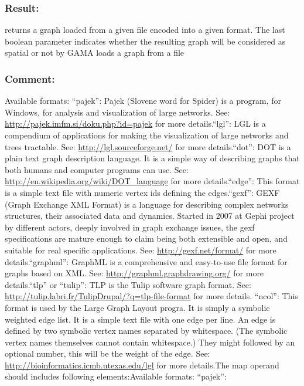 \documentclass[]{book}
\theoremstyle{definition}
\theoremstyle{definition}
\theoremstyle{definition}
\theoremstyle{remark}
\begin{document}
\subsubsection{Result:}\label{result-316}

returns a graph loaded from a given file encoded into a given format.
The last boolean parameter indicates whether the resulting graph will be
considered as spatial or not by GAMA loads a graph from a file

\subsubsection{Comment:}\label{comment-62}

Available formats: ``pajek'': Pajek (Slovene word for Spider) is a
program, for Windows, for analysis and visualization of large networks.
See: \url{http://pajek.imfm.si/doku.php?id=pajek} for more
details.``lgl'': LGL is a compendium of applications for making the
visualization of large networks and trees tractable. See:
\url{http://lgl.sourceforge.net/} for more details.``dot'': DOT is a
plain text graph description language. It is a simple way of describing
graphs that both humans and computer programs can use. See:
\url{http://en.wikipedia.org/wiki/DOT_language} for more
details.``edge'': This format is a simple text file with numeric vertex
ids defining the edges.``gexf'': GEXF (Graph Exchange XML Format) is a
language for describing complex networks structures, their associated
data and dynamics. Started in 2007 at Gephi project by different actors,
deeply involved in graph exchange issues, the gexf specifications are
mature enough to claim being both extensible and open, and suitable for
real specific applications. See: \url{http://gexf.net/format/} for more
details.``graphml'': GraphML is a comprehensive and easy-to-use file
format for graphs based on XML. See:
\url{http://graphml.graphdrawing.org/} for more details.``tlp'' or
``tulip'': TLP is the Tulip software graph format. See:
\url{http://tulip.labri.fr/TulipDrupal/?q=tlp-file-format} for more
details. ``ncol'': This format is used by the Large Graph Layout progra.
It is simply a symbolic weighted edge list. It is a simple text file
with one edge per line. An edge is defined by two symbolic vertex names
separated by whitespace. (The symbolic vertex names themselves cannot
contain whitespace.) They might followed by an optional number, this
will be the weight of the edge. See:
\url{http://bioinformatics.icmb.utexas.edu/lgl} for more details.The map
operand should includes following elements:Available formats: ``pajek'':
\end{document}

